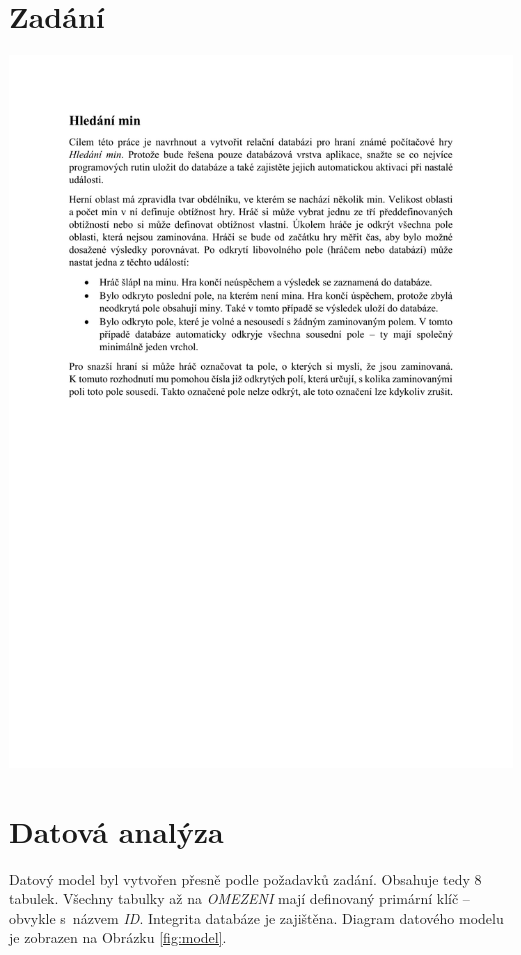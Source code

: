 \documentclass[12pt, a4paper]{article}
\begin{document}
\section{Zadání}
\includegraphics[trim=3cm 800 3cm 100,width=1\linewidth]{assignment}


\section{Datová analýza}
Datový model byl vytvořen přesně podle požadavků zadání.
Obsahuje tedy 8 tabulek.
Všechny tabulky až na \emph{OMEZENI} mají definovaný primární klíč – obvykle s~názvem \emph{ID}.
Integrita databáze je zajištěna.
Diagram datového modelu je zobrazen na Obrázku \ref{fig:model}.
\end{document}
